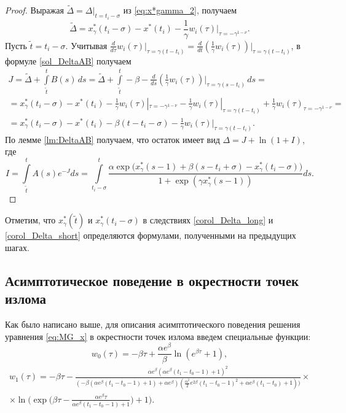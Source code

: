 %
\begin{proof}
	Выражая $\tilde{\Delta} = \Delta|_{t = t_i - \sigma}$ из \eqref{eq:x*gamma_2}, получаем
\[
	\tilde{\Delta} = x^*_{\gamma}(t_i - \sigma) - x^*(t_i) - \frac{1}{\gamma} w_i(\tau)|_{\tau = -\gamma^{1-\nu}}.
\]
Пусть $\tilde{t} = t_i - \sigma$. Учитывая $\frac{d}{d\tau} w_i(\tau)|_{\tau = \gamma(t - t_i)} = \frac{d}{dt} \left(\frac{1}{\gamma}w_i(\tau)\right)\big|_{\tau = \gamma(t - t_i)}$, в формуле \eqref{sol_DeltaAB} получаем
\begin{multline*}
	J = \tilde{\Delta} + \int\limits_{\tilde{t}}^{t} B(s)\,ds = \tilde{\Delta} + \int\limits_{\tilde{t}}^{t} -\beta - \frac{d}{ds} \left(\frac{1}{\gamma}w_i(\tau)\right)\big|_{\tau = \gamma(s - t_i)} \,ds =\\= x^*_{\gamma}(t_i - \sigma) - x^*(t_i) - \frac{1}{\gamma} w_i(\tau)|_{\tau = -\gamma^{1-\nu}} - \frac{1}{\gamma}w_i(\tau)|_{\tau = \gamma(t - t_i)} + \frac{1}{\gamma}w_i(\tau)_{\tau = -\gamma^{1 - \nu}} = \\
	= x^*_{\gamma}(t_i - \sigma) - x^*(t_i) - \beta(t - t_i - \sigma) - \frac{1}{\gamma} w_i(\tau)|_{\tau = \gamma(t - t_i)}.
\end{multline*}
%
По лемме \ref{lm:DeltaAB} получаем, что остаток имеет вид $\Delta = J + \ln(1 + I)$, где 
\[
I = \int\limits_{\tilde{t}}^{t}A(s) e^{-J} ds = \int\limits_{t_i-\sigma}^{t}\frac{\alpha\exp\big(x_{\gamma}^*(s-1)+\beta(s-t_i+\sigma)-x_{\gamma}^*(t_i-\sigma)\big)}{1+\exp(\gamma x_{\gamma}^*(s-1))}ds.
\]
\end{proof}
%
Отметим, что $x_{\gamma}^*(\tilde{t})$ и $x_{\gamma}^*(t_i-\sigma)$ в следствиях \ref{corol_Delta_long} и \ref{corol_Delta_short} определяются формулами, полученными на предыдущих шагах.


\subsection{Асимптотическое поведение в окрестности точек излома}

Как было написано выше, для описания асимптотического поведения решения уравнения \eqref{eq:MG_x} в окрестности точек излома введем специальные функции:
%
\begin{equation}
    \label{eq:w0}
    w_0(\tau)=-\beta \tau+\frac{\alpha e^\beta}{\beta}\ln(e^{\beta\tau}+1),
\end{equation}
%
\small
\begin{multline}
    \label{eq:w1}
    w_1(\tau)=-\beta\tau-\frac{\alpha e^\beta(\alpha e^\beta(t_1-t_0-1)+1)^2}{(-\beta(\alpha e^\beta(t_1-t_0-1)+1)+\alpha e^\beta)(\frac{\alpha^2}{2}e^{2\beta}(t_1-t_0-1)^2+\alpha e^{\beta}(t_1-t_0)+1))}\times
    \\
    \times\ln\Bigg(\exp\Big(\beta\tau-\frac{\alpha e^\beta\tau}{\alpha e^\beta(t_1-t_0-1)+1}\Big)+1\Bigg).
\end{multline}
\normalsize

